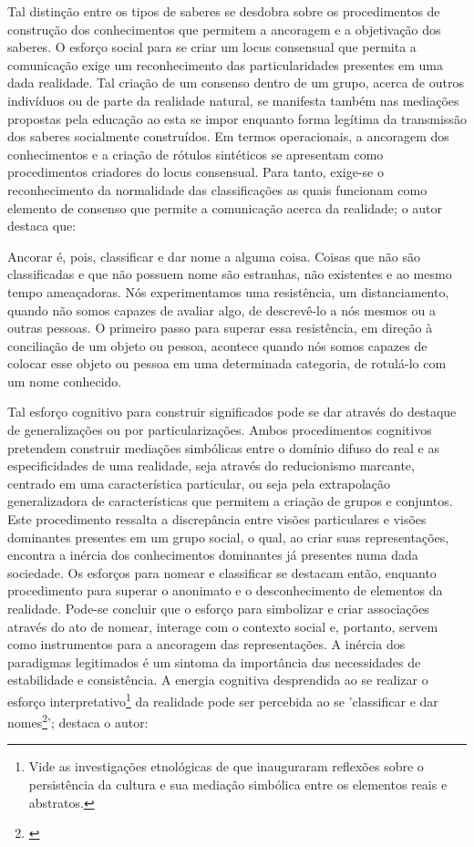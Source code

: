 \documentclass[
   article,       %
   12pt,          %
   oneside,       %
   a4paper,       %
   english,       %
   brazil,           %
   sumario=tradicional
   ]{abntex2}
\begin{document}
Tal distinção entre os tipos de saberes se desdobra sobre os procedimentos de construção dos conhecimentos que permitem a ancoragem e a objetivação dos saberes. O esforço social para se criar um locus consensual que permita a comunicação exige um reconhecimento das particularidades presentes em uma dada realidade. Tal criação de um consenso dentro de um grupo, acerca de outros indivíduos ou de parte da realidade natural, se manifesta também nas mediações propostas pela educação ao esta se impor enquanto forma legítima da transmissão dos saberes socialmente construídos. Em termos operacionais, a ancoragem dos conhecimentos e a criação de rótulos sintéticos se apresentam como procedimentos criadores do locus consensual. Para tanto, exige-se o reconhecimento da normalidade das classificações as quais funcionam como elemento de consenso que permite a comunicação acerca da realidade; o autor destaca que:

\begin{citacao}
Ancorar é, pois, classificar e dar nome a alguma coisa. Coisas
que não são classificadas e que não possuem nome são estranhas,
não existentes e ao mesmo tempo ameaçadoras. Nós experimentamos 
uma resistência, um distanciamento, quando não somos 
capazes de avaliar algo, de descrevê-lo a nós mesmos ou a outras
pessoas. O primeiro passo para superar essa resistência, em 
direção à conciliação de um objeto ou pessoa, acontece quando nós
somos capazes de colocar esse objeto ou pessoa em uma 
determinada categoria, de rotulá-lo com um nome conhecido.\cite[p.61-62]{Representacees_sociais_moscovici}
\end{citacao}


Tal esforço cognitivo para construir significados pode se dar através do destaque de generalizações ou por particularizações. Ambos procedimentos cognitivos pretendem construir mediações simbólicas entre o domínio difuso do real e as especificidades de uma realidade, seja através do reducionismo marcante, centrado em uma característica particular, ou seja pela extrapolação generalizadora de características que permitem a criação de grupos e conjuntos. Este procedimento ressalta a discrepância entre visões particulares e visões dominantes presentes em um grupo social, o qual, ao criar suas representações, encontra a inércia dos conhecimentos dominantes já presentes numa dada sociedade. Os esforços para nomear e classificar se destacam então, enquanto procedimento para superar o anonimato e o desconhecimento de elementos da realidade. Pode-se concluir que o esforço para simbolizar e criar associações através do ato de nomear, interage com o contexto social e, portanto, servem como instrumentos para a ancoragem das representações. A inércia dos paradigmas legitimados é um sintoma da importância das necessidades de estabilidade e consistência. A energia cognitiva desprendida ao se realizar o esforço interpretativo\footnote{Vide as investigações etnológicas de \cite{Culturas_Geertz} que inauguraram reflexões sobre o persistência da cultura e sua mediação simbólica entre os elementos reais e abstratos.} da realidade pode ser percebida ao se 'classificar e dar nomes\footnote{\cite[p.68]{Representacees_sociais_moscovici}}'; destaca o autor:
\end{document}

